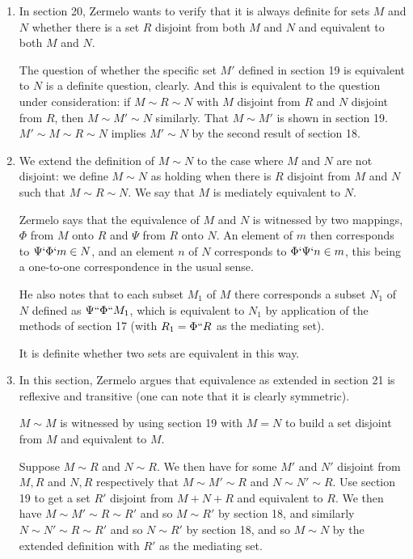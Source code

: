 \documentclass[12pt]{article}
\begin{document}
\begin{enumerate}
\begin{description}
\end{description}

\item  In section 20, Zermelo wants to verify that it is always definite for sets $M$ and $N$ whether there is a set $R$ disjoint from both $M$ and $N$ and equivalent to both $M$ and $N$.

The question of whether the specific set $M'$ defined in section 19 is equivalent to $N$ is a definite question, clearly.  And this is equivalent to the question under consideration:
if $M \sim R \sim N$ with $M$ disjoint from $R$ and $N$ disjoint from $R$, then $M \sim M' \sim N$ similarly.  That $M \sim M'$ is shown in section 19.  $M' \sim M \sim R \sim N$ implies
$M' \sim N$ by the second result of section 18.

\item  We extend the definition of $M \sim N$ to the case where $M$ and $N$ are not disjoint:  we define $M \sim N$ as holding when there is $R$ disjoint from $M$ and $N$ such that
$M \sim R \sim N$.  We say that $M$ is mediately equivalent to $N$.  

Zermelo says that the equivalence of $M$ and $N$ is witnessed by two mappings, $\Phi$ from $M$ onto $R$ and $\Psi$ from $R$ onto $N$.  An element of $m$ then corresponds to $\Psi`\Phi`m \in N$, and an element $n$ of $N$ corresponds to $\Phi`\Psi`n \in m$, this being a one-to-one correspondence in the usual sense.

He also notes that to each subset $M_1$ of $M$ there corresponds a subset $N_1$ of $N$ defined as $\Psi``\Phi``M_1$, which is equivalent to $N_1$ by application of the methods of section 17 (with $R_1 = \Phi``R$ as the mediating set).

It is definite whether two sets are equivalent in this way.

\item  In this section, Zermelo argues that equivalence as extended in section 21 is reflexive and transitive (one can note that it is clearly symmetric).

$M \sim M$ is witnessed by using section 19 with $M=N$ to build a set disjoint from $M$ and equivalent to $M$.

Suppose $M\sim R$ and $N \sim R$.  We then have for some $M'$ and $N'$ disjoint from $M, R$ and $N,R$ respectively that $M \sim M' \sim R$ and $N \sim N' \sim R$.
Use section 19 to get a set $R'$ disjoint from $M+N+R$ and equivalent to $R$.  We then have $M \sim M' \sim  R \sim R'$ and so $M \sim R'$ by section 18, and
similarly $N \sim N' \sim  R \sim R'$ and so $N \sim R'$ by section 18, and so $M \sim N$ by the extended definition with $R'$ as the mediating set.


\end{enumerate}
\end{document}
